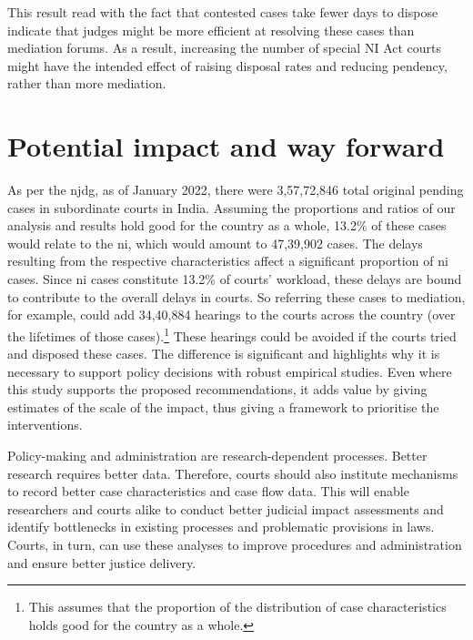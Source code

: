 \documentclass[11pt,a4paper]{article}
\begin{document}
This result read with the fact that contested cases take fewer days to dispose indicate that judges might be more efficient at resolving these cases than mediation forums. As a result, increasing the number of special NI Act courts might have the intended effect of raising disposal rates and reducing pendency, rather than more mediation.

\section{Potential impact and way forward} \label{sec:impact-case-loads}

As per the \gls{njdg}, as of January 2022, there were 3,57,72,846 total original pending cases in subordinate courts in India. Assuming the proportions and ratios of our analysis and results hold good for the country as a whole, 13.2\% of these cases would relate to the \gls{ni}, which would amount to 47,39,902 cases. The delays resulting from the respective characteristics affect a significant proportion of \gls{ni} cases. Since \gls{ni} cases constitute 13.2\% of courts' workload, these delays are bound to contribute to the overall delays in courts. So referring these cases to mediation, for example, could add 34,40,884 hearings to the courts across the country (over the lifetimes of those cases).\footnote{This assumes that the proportion of the distribution of case characteristics holds good for the country as a whole.} These hearings could be avoided if the courts tried and disposed these cases. The difference is significant and highlights why it is necessary to support policy decisions with robust empirical studies. Even where this study supports the proposed recommendations, it adds value by giving estimates of the scale of the impact, thus giving a framework to prioritise the interventions.

Policy-making and administration are research-dependent processes. Better research requires better data. Therefore, courts should also institute mechanisms to record better case characteristics and case flow data. This will enable researchers and courts alike to conduct better judicial impact assessments and identify bottlenecks in existing processes and problematic provisions in laws. Courts, in turn, can use these analyses to improve procedures and administration and ensure better justice delivery.
\end{document}
